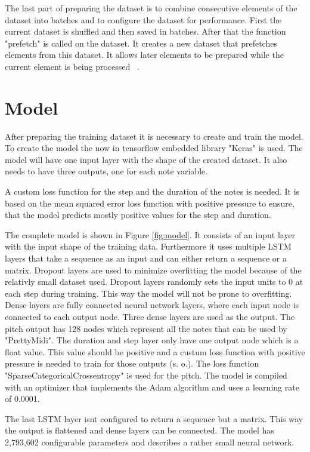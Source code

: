 The last part of preparing the dataset is to combine consecutive elements of the dataset into batches and to configure
the dataset for performance. First the current dataset is shuffled and then saved in batches. After that the function
"prefetch" is called on the dataset. It creates a new dataset that prefetches elements from this dataset. It allows later 
elements to be prepared while the current element is being processed ~\cite{noauthor_tfdatadataset_nodate}.

\section{Model}
\label{model}

After preparing the training dataset it is necessary to create and train the model. To create the model the now in tensorflow
embedded library "Keras" is used. The model will have one input layer with the shape of the created dataset. It also needs 
to have three outputs, one for each note variable.

A custom loss function for the step and the duration of the notes is needed. It is based on the mean squared error loss function
with positive pressure to ensure, that the model predicts mostly positive values for the step and duration. 

The complete model is shown in Figure \ref{fig:model}. It consists of an input layer with the input shape of the training data.
Furthermore it uses multiple LSTM layers that take a sequence as an input and can either return a sequence or a matrix. Dropout layers are
used to minimize overfitting the model because of the relativly small dataset used. Dropout layers randomly sets the input units to 0
at each step during training. This way the model will not be prone to overfitting. Dense layers are fully connected neural network
layers, where each input node is connected to each output node. Three dense layers are used as the output. The pitch output has 128 nodes 
which represent all the notes that can be used by "PrettyMidi". The duration and step layer only have one output node which
is a float value. This value should be positive and a custum loss function with positive pressure is needed to train
for those outputs (s. o.). The loss function "SparseCategoricalCrossentropy" is used for the pitch. The model is compiled with
an optimizer that implements the Adam algorithm and uses a learning rate of 0.0001.

The last LSTM layer isnt configured to return a sequence but a matrix. This way the output is flattened and dense layers can be connected.
The model has 2,793,602 configurable parameters and describes a rather small neural network.

